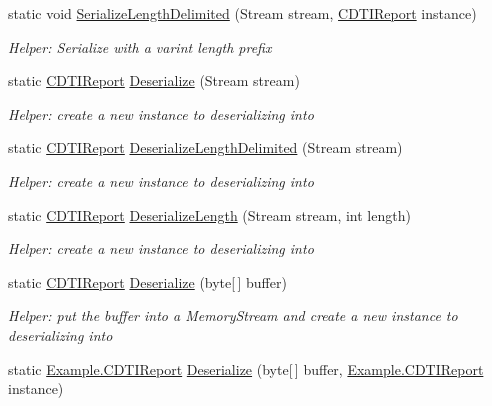 \begin{DoxyCompactItemize}
static void \hyperlink{class_example_1_1_c_d_t_i_report_a587ec4906faa62164e4dd7106ab43172}{Serialize\+Length\+Delimited} (Stream stream, \hyperlink{class_example_1_1_c_d_t_i_report}{C\+D\+T\+I\+Report} instance)
\begin{DoxyCompactList}\small\item\em Helper\+: Serialize with a varint length prefix\end{DoxyCompactList}\item 
static \hyperlink{class_example_1_1_c_d_t_i_report}{C\+D\+T\+I\+Report} \hyperlink{class_example_1_1_c_d_t_i_report_ac839a59baea94b2d0d85e233f0afaf31}{Deserialize} (Stream stream)
\begin{DoxyCompactList}\small\item\em Helper\+: create a new instance to deserializing into\end{DoxyCompactList}\item 
static \hyperlink{class_example_1_1_c_d_t_i_report}{C\+D\+T\+I\+Report} \hyperlink{class_example_1_1_c_d_t_i_report_a6e790e0e071fac05495f369414a8131a}{Deserialize\+Length\+Delimited} (Stream stream)
\begin{DoxyCompactList}\small\item\em Helper\+: create a new instance to deserializing into\end{DoxyCompactList}\item 
static \hyperlink{class_example_1_1_c_d_t_i_report}{C\+D\+T\+I\+Report} \hyperlink{class_example_1_1_c_d_t_i_report_a12c67ba955b64011c831c1f9b3f64f07}{Deserialize\+Length} (Stream stream, int length)
\begin{DoxyCompactList}\small\item\em Helper\+: create a new instance to deserializing into\end{DoxyCompactList}\item 
static \hyperlink{class_example_1_1_c_d_t_i_report}{C\+D\+T\+I\+Report} \hyperlink{class_example_1_1_c_d_t_i_report_a7ef6d83b62dd2beac045403f6e1a8054}{Deserialize} (byte\mbox{[}$\,$\mbox{]} buffer)
\begin{DoxyCompactList}\small\item\em Helper\+: put the buffer into a Memory\+Stream and create a new instance to deserializing into\end{DoxyCompactList}\item 
static \hyperlink{class_example_1_1_c_d_t_i_report}{Example.\+C\+D\+T\+I\+Report} \hyperlink{class_example_1_1_c_d_t_i_report_a858fd88fb0a1f98ee24f1ddd1d43e3e0}{Deserialize} (byte\mbox{[}$\,$\mbox{]} buffer, \hyperlink{class_example_1_1_c_d_t_i_report}{Example.\+C\+D\+T\+I\+Report} instance)

\end{DoxyCompactItemize}
